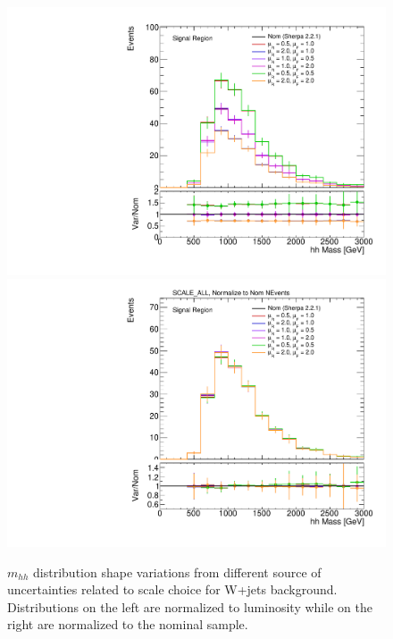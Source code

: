 \begin{figure}[!htbp]
\begin{center}
\includegraphics[scale=0.33]{./figures/boosted/systematics/wjets_alt_hhMass_SR_syst_SCALE_ALL_UnNormalized}
\includegraphics[scale=0.33]{./figures/boosted/systematics/wjets_alt_hhMass_SR_syst_SCALE_ALL}
\caption{$m_{hh}$ distribution shape variations from different source of uncertainties related 
to scale choice for W+jets background. Distributions on the left are normalized to luminosity while on 
the right are normalized to the nominal sample.}
\label{fig:boosted_systematics_wjets_sr_scale}
\end{center}
\end{figure}


